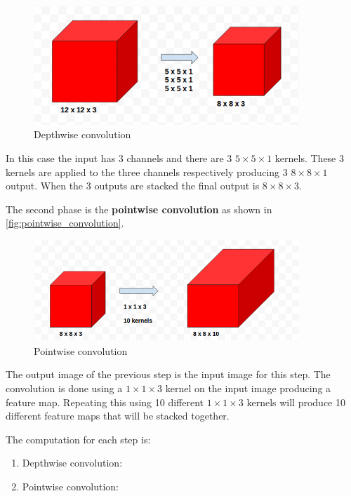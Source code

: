 \begin{figure}[ht]
    \includegraphics[width=10cm]{images/experiments/depthwise_convolution.png}
    \centering
    \caption{Depthwise convolution}\label{fig:depthwise_convolution}
\end{figure}

In this case the input has 3 channels and there are 3 $5\times5\times1$
kernels. These 3 kernels are applied to the three channels respectively
producing 3 $8\times8\times1$ output. When the 3 outputs are stacked the final
output is $8\times8\times3$.

The second phase is the \textbf{pointwise convolution} as shown in
\autoref{fig:pointwise_convolution}.

\begin{figure}[ht]
    \includegraphics[width=10cm]{images/experiments/pointwise_convolution.png}
    \centering
    \caption{Pointwise convolution}\label{fig:pointwise_convolution}
\end{figure}

The output image of the previous step is the input image for this step.
The convolution is done using a $1\times1\times3$ kernel on the input image
producing a feature map. Repeating this using 10 different $1\times1\times3$
kernels will produce 10 different feature maps that will be stacked together.

The computation for each step is:
\begin{enumerate}
    \item Depthwise convolution: 
    \item Pointwise convolution: 
\end{enumerate}

